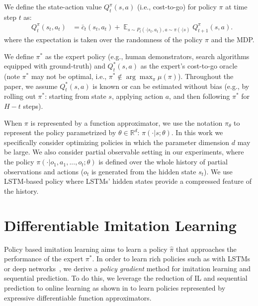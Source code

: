 \documentclass{article}
\begin{document}


We define the state-action value $Q_t^{\pi}(s,a)$ (i.e., cost-to-go) for policy $\pi$ at time step $t$ as:
\begin{align}
&Q_t^{\pi}(s_t,a_t) %
&=\bar{c}_t(s_t,a_t) + \mathop{\mathbb{E}}_{s\sim P_t(\cdot|s_t,a_t),a\sim\pi(\cdot|s)}Q^\pi_{t+1}(s,a). \nonumber
\end{align} where the expectation is taken over the randomness of the policy $\pi$ and the MDP. 

We define $\pi^{*}$ as the expert policy (e.g., human demonstrators, search algorithms equipped with ground-truth) and $Q^*_t(s,a)$ as the expert's cost-to-go oracle (note $\pi^*$ may not be optimal, i.e., $\pi^* \not\in \arg\max_{\pi} \mu(\pi)$). Throughout the paper, we assume $Q_t^{*}(s,a)$ is known or can be estimated without bias (e.g., by rolling out $\pi^*$: starting from state $s$, applying action $a$, and then following $\pi^*$ for $H-t$ steps). %

When $\pi$ is represented by a function approximator, we use the notation $\pi_{\theta}$ to represent the policy parametrized by $\theta\in \mathbb{R}^{d}$: $\pi(\cdot|s;\theta)$. In this work we specifically consider optimizing policies in which the parameter dimension $d$ may be large.  We also consider partial observable setting in our experiments, where the policy $\pi(\cdot|o_1,a_1,...,o_t;\theta)$ is defined over the whole history of partial observations and actions ($o_t$ is generated from the hidden state $s_t$). We use LSTM-based policy \cite{duan2016benchmarking} where LSTMs' hidden states provide a compressed feature of the history.



\section{Differentiable Imitation Learning}
\label{sec:alg}
Policy based imitation learning aims to learn a policy $\hat \pi$ that approaches the performance of the expert $\pi^*$. In order to learn rich policies such as with LSTMs or deep networks~\cite{schulman2015trust}, we derive a \emph{policy gradient} method for imitation learning and sequential prediction. To do this, we leverage the reduction of IL and sequential prediction to online learning as shown in \citep{ross2014reinforcement} to learn policies represented by expressive differentiable function approximators. 
\end{document}
